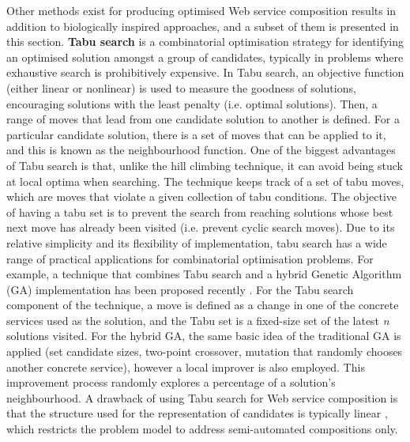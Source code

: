 Other methods exist for producing optimised Web service composition results in addition to biologically inspired approaches, and a subset of them is presented in this section. \textbf{Tabu search} \cite{glover1989tabu} is a combinatorial optimisation strategy for identifying an optimised solution amongst a group of candidates, typically in problems where exhaustive search is prohibitively expensive. In Tabu search, an objective function (either linear or nonlinear) is used to measure the goodness of solutions, encouraging solutions with the least penalty (i.e. optimal solutions). Then, a range of moves that lead from one candidate solution to another is defined. For a particular candidate solution,
there is a set of moves that can be applied to it, and this is known as the neighbourhood function. One of the biggest advantages of Tabu search is that, unlike the
hill climbing technique, it can avoid being stuck at local optima when searching. The technique keeps track of a set of tabu moves, which are moves that violate a given
collection of tabu conditions. The objective of having a tabu set is to prevent the search from reaching solutions whose best next move has already been visited (i.e. prevent cyclic search moves). Due to its relative simplicity and its flexibility of implementation, tabu search has a wide range of practical applications for combinatorial
optimisation problems. For example, a technique that combines Tabu search and a hybrid Genetic Algorithm (GA) implementation has been proposed recently \cite{parejo2008qos}. For the Tabu search component of the technique, a move is defined as a change in one of the concrete services used as the solution, and the Tabu set is a fixed-size set of the latest
\textit{n} solutions visited. For the hybrid GA, the same basic idea of the traditional GA is applied (set candidate sizes, two-point crossover, mutation that randomly chooses another concrete service), however a local improver is also employed. This improvement process randomly explores a percentage of a solution's neighbourhood. A drawback of using Tabu search for Web service composition is that the structure used for the representation of candidates is typically linear \cite{parejo2008qos,bahadori2009optimal}, which restricts the problem model to address semi-automated compositions only.

